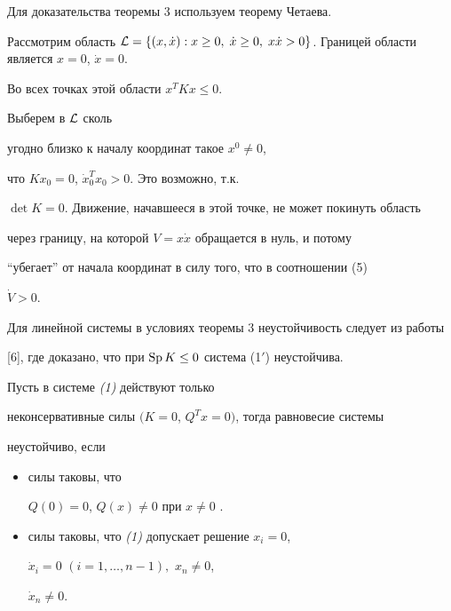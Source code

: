 Для доказательства теоремы 3 используем теорему Четаева.


Рассмотрим область ${\cal L}=\{ (x,\Dot x): x\ge 0,\; \Dot x \ge 0,\;


x\Dot x >0\}$. Границей области является $x=0$, $\Dot x=0$.


Во всех точках этой области $x^{T}Kx\le 0$.


Выберем в ${\cal L}$ сколь


угодно близко к началу координат такое $x^{0} \ne 0$,


что $Kx_{0}=0$, $ \Dot{x}_{0}^{T}x_{0}>0$. Это возможно, т.к.


$\det K=0$. Движение, начавшееся в этой точке, не может покинуть область


через границу, на которой $V=x\Dot x$ обращается в нуль, и потому


``убегает'' от начала координат в силу того, что в соотношении (5)


$\Dot V>0$.





Для линейной системы в условиях теоремы 3 неустойчивость следует из работы


[6], где доказано, что при $\operatorname{Sp} K\le 0$ система (1$'$) неустойчива.





\begin{thm} Пусть в системе {\em (1)} действуют только


неконсервативные силы $(K=0$, $Q^{T}x=0)$, тогда равновесие системы


неустойчиво, если


\begin{itemize}


\item[1.] силы таковы, что


$Q(0)=0$, $Q(x)\ne {0}$ при $x \ne {0}$ \cite{Mer}.


\item[2.] силы таковы, что {\em (1)} допускает решение $x_{i}=0$,


$\Dot{x}_{i}=0$ $(i=1, \dotsc ,n-1),$ $x_{n}\ne {0}$,


$\Dot{x}_{n}\ne{0}$.


\end{itemize}


\end{thm}





